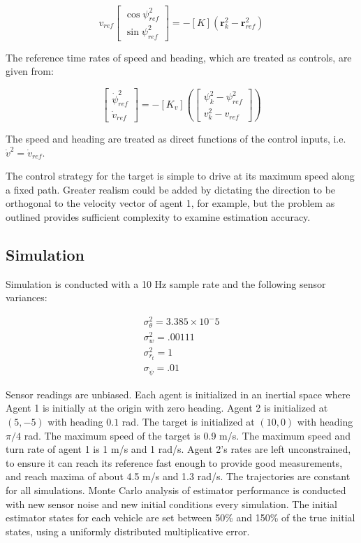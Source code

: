 \documentclass{aiaa-tc}
\newcommand{\B}[1]{\textbf{#1}} %
\begin{document}
\begin{equation}
v_{ref}\begin{bmatrix}
\cos{\psi^2_{ref}}\\
\sin{\psi^2_{ref}}
\end{bmatrix} = -[K](\B{r}^2_k - \B{r}^2_{ref})
\end{equation}

The reference time rates of speed and heading, which are treated as controls,  are given from:

\begin{equation}
\begin{bmatrix}
\dot{\psi}^2_{ref}\\
\dot{v}_{ref}
\end{bmatrix} = 
-[K_v]\left(\begin{bmatrix}
\psi^2_k - \psi^2_{ref}\\
v^2_k - v_{ref}
\end{bmatrix}\right)
\end{equation}

The speed and heading are treated as direct functions of the control inputs, i.e. $\dot{v}^2 = \dot{v}_{ref}$.

The control strategy for the target is simple to drive at its maximum speed along a fixed path. Greater realism could be added by dictating the direction to be orthogonal to the velocity vector of agent 1, for example, but the problem as outlined provides sufficient complexity to examine estimation accuracy.

\subsection{Simulation}

Simulation is conducted with a 10 Hz sample rate and the following sensor variances:

\begin{align}
\sigma_\theta^2 = 3.385 \times 10^-5 \\
\sigma_w^2 = .00111 \\
\sigma_{r_t}^2 = 1 \\
\sigma_{\dot{\psi}} = .01
\end{align}

Sensor readings are unbiased. Each agent is initialized in an inertial space where Agent 1 is initially at the origin with zero heading. Agent 2 is initialized at $(5,-5)$ with heading $0.1$ rad. The target is initialized at $(10,0)$ with heading $\pi/4$ rad. The maximum speed of the target is 0.9 m/s. The maximum speed and turn rate of agent 1 is 1 m/s and 1 rad/s. Agent 2's rates are left unconstrained, to ensure it can reach its reference fast enough to provide good measurements, and reach maxima of about 4.5 m/s and 1.3 rad/s. The trajectories are constant for all simulations. Monte Carlo analysis of estimator performance is conducted with new sensor noise and new initial conditions every simulation. The initial estimator states for each vehicle are set between 50\% and 150\% of the true initial states, using a uniformly distributed multiplicative error.
\end{document}
